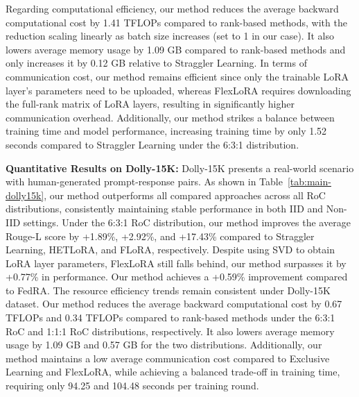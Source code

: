 \documentclass[lettersize,journal]{IEEEtran}
\begin{document}
{Regarding computational efficiency, our method reduces the average backward computational cost by 1.41 TFLOPs compared to rank-based methods, with the reduction scaling linearly as batch size increases (set to 1 in our case). It also lowers average memory usage by 1.09 GB compared to rank-based methods and only increases it by 0.12 GB relative to Straggler Learning. In terms of communication cost, our method remains efficient since only the trainable LoRA layer’s parameters need to be uploaded, whereas FlexLoRA requires downloading the full-rank matrix of LoRA layers, resulting in significantly higher communication overhead. Additionally, our method strikes a balance between training time and model performance, increasing training time by only 1.52 seconds compared to Straggler Learning under the 6:3:1 distribution.
}

{\textbf{Quantitative Results on Dolly-15K:} 
Dolly-15K presents a real-world scenario with human-generated prompt-response pairs. As shown in Table~\ref{tab:main-dolly15k}, our method outperforms all compared approaches across all RoC distributions, consistently maintaining stable performance in both IID and Non-IID settings. Under the 6:3:1 RoC distribution, our method improves the average Rouge-L score by +1.89\%, +2.92\%, and +17.43\% compared to Straggler Learning, HETLoRA, and FLoRA, respectively. Despite using SVD to obtain LoRA layer parameters, FlexLoRA still falls behind, our method surpasses it by +0.77\% in performance. Our method achieves a +0.59\% improvement compared to FedRA.
The resource efficiency trends remain consistent under Dolly-15K dataset. Our method reduces the average backward computational cost by 0.67 TFLOPs and 0.34 TFLOPs compared to rank-based methods under the 6:3:1 RoC and 1:1:1 RoC distributions, respectively. It also lowers average memory usage by 1.09 GB and 0.57 GB for the two distributions. Additionally, our method maintains a low average communication cost compared to Exclusive Learning and FlexLoRA, while achieving a balanced trade-off in training time, requiring only 94.25 and 104.48 seconds per training round.
}
\end{document}
